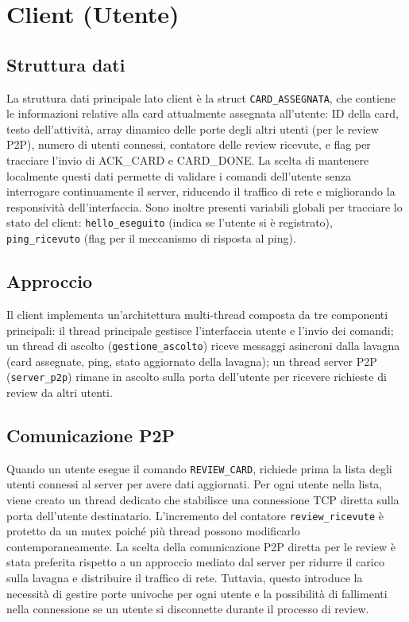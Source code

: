 \documentclass[a4paper,11pt]{article}
\begin{document}
\section*{Client (Utente)}
\subsection*{Struttura dati}
La struttura dati principale lato client è la struct \texttt{CARD\_ASSEGNATA}, che contiene le informazioni relative alla card attualmente assegnata all'utente: 
ID della card, testo dell'attività, array dinamico delle porte degli altri utenti (per le review P2P), numero di utenti connessi, contatore delle review ricevute, 
e flag per tracciare l'invio di ACK\_CARD e CARD\_DONE. La scelta di mantenere localmente questi dati permette di validare i comandi dell'utente senza interrogare continuamente il server, riducendo 
il traffico di rete e migliorando la responsività dell'interfaccia. 
Sono inoltre presenti variabili globali per tracciare lo stato del client: \texttt{hello\_eseguito} (indica se l'utente si è registrato), 
\texttt{ping\_ricevuto} (flag per il meccanismo di risposta al ping). 

\subsection*{Approccio}
Il client implementa un'architettura multi-thread composta da tre componenti principali: il thread principale gestisce l'interfaccia utente e l'invio dei comandi; 
un thread di ascolto (\texttt{gestione\_ascolto}) riceve messaggi asincroni dalla lavagna (card assegnate, ping, stato aggiornato della lavagna); 
un thread server P2P (\texttt{server\_p2p}) rimane in ascolto sulla porta dell'utente per ricevere richieste di review da altri utenti.

\subsection*{Comunicazione P2P}
Quando un utente esegue il comando \texttt{REVIEW\_CARD}, richiede prima la lista degli utenti connessi al server per avere dati aggiornati. Per ogni utente nella lista, 
viene creato un thread dedicato che stabilisce una connessione TCP diretta sulla porta dell'utente destinatario. L'incremento del contatore \texttt{review\_ricevute} 
è protetto da un mutex poiché più thread possono modificarlo contemporaneamente. 
La scelta della comunicazione P2P diretta per le review è stata preferita rispetto a un approccio mediato dal server per ridurre il carico sulla lavagna e 
distribuire il traffico di rete. Tuttavia, questo introduce la necessità di gestire porte univoche per ogni utente e la possibilità di fallimenti nella connessione 
se un utente si disconnette durante il processo di review.
\end{document}
